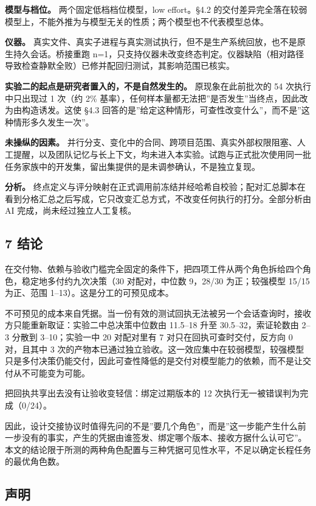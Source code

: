 \documentclass[
]{article}
\begin{document}
\textbf{模型与档位。} 两个固定低档档位模型，low effort。§4.2
的交付差异完全落在较弱模型上，不能外推为与模型无关的性质；两个模型也不代表模型总体。

\textbf{仪器。}
真实文件、真实子进程与真实测试执行，但不是生产系统回放，也不是原生持久会话。桥接重跑
n=1，只支持仪器未改变终态判定。仪器缺陷（相对路径导致检查静默全败）已修并配回归测试，其影响范围已核实。

\textbf{实验二的起点是研究者置入的，不是自然发生的。} 原现象在此前批次的
54 次执行中只出现过 1 次（约 2\%
基率），任何样本量都无法把''是否发生''当终点，因此改为由构造诱发。这使
§4.3
回答的是''给定这种情形，可查性改变什么''，而不是''这种情形多久发生一次''。

\textbf{未操纵的因素。}
并行分支、变化中的合同、跨项目范围、真实外部权限阻塞、人工提醒，以及团队记忆与长上下文，均未进入本实验。试跑与正式批次使用同一批任务家族中的开发集，留出集提供的是未调参确认，不是独立复现。

\textbf{分析。}
终点定义与评分映射在正式调用前冻结并经哈希自校验；配对汇总脚本在看到分格汇总之后写成，它只改变汇总方式，不改变任何执行的打分。全部分析由
AI 完成，尚未经过独立人工复核。

\subsection{7 结论}\label{ux7ed3ux8bba}

在交付物、依赖与验收门槛完全固定的条件下，把四项工件从两个角色拆给四个角色，稳定地多付约九次决策（30
对配对，中位数 9，28/30 为正；较强模型 15/15 为正、范围
1--13）。这是分工的可预见成本。

不可预见的成本来自凭据。当一份有效的测试回执无法被另一个会话查询时，接收方只能重新取证：实验二中总决策中位数由
11.5--18 升至 30.5--32，索证轮数由 2--3 分散到 3--10；实验一中 20
对配对里有 7 对只在回执可查时交付，反方向 0 对，且其中 3
次的产物本已通过独立验收。这一效应集中在较弱模型，较强模型只是多付决策仍能交付，因此可查性降低的是交付对模型能力的依赖，而不是让交付从不可能变为可能。

把回执共享出去没有让验收变轻信：绑定过期版本的 12
次执行无一被错误判为完成（0/24）。

因此，设计交接协议时值得先问的不是''要几个角色''，而是''这一步能产生什么前一步没有的事实，产生的凭据由谁签发、绑定哪个版本、接收方据什么认可它''。本文的结论限于所测的两种角色配置与三种凭据可见性水平，不足以确定长程任务的最优角色数。

\subsection{声明}\label{ux58f0ux660e}
\end{document}
